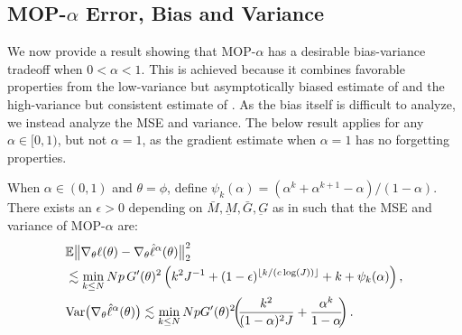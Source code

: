 \documentclass[numsec,webpdf,modern,medium,namedate]{oup-authoring-template}
\newcommand\arxiv[2]{#2} %
\theoremstyle{thmstyleone}%
\theoremstyle{thmstyletwo}%
\theoremstyle{thmstylethree}%
\begin{document}
\arxiv{}{\vspace*{-2mm}}
\subsection{MOP-$\alpha$ Error, Bias and Variance}

We now provide a result showing that MOP-$\alpha$ has a desirable bias-variance tradeoff when $0<\alpha<1$.
This is achieved because it combines favorable properties from the low-variance but asymptotically biased estimate of \cite{naesseth18} and the high-variance but consistent estimate of \cite{poyiadjis11}. 
As the bias itself is difficult to analyze, we instead analyze the MSE and variance. 
The below result applies for any $\alpha \in [0,1)$, but not $\alpha=1$, as the gradient estimate when $\alpha=1$ has no forgetting properties. 

\begin{thm}
    \label{thm:mop-biasvar}
    When $\alpha\in (0,1)$ and $\theta=\phi$, define $\psi_k(\alpha)=(\alpha^k  + \alpha^{k+1} - \alpha)/(1-\alpha)$. 
    There exists an $\epsilon>0$ depending on $\bar{M}, \underbar{M}, \bar{G}, \underbar{G}$ as in \cite{karjalainen23} such that the MSE and variance of MOP-$\alpha$ are:
    \vspace*{-1ex}
    \arxiv{\begin{eqnarray}
        \E\big\|\nabla_\theta\ell(\theta) - \nabla_\theta \hat\ell^\alpha(\theta)\big\|_2^2 
        &\lesssim& \min_{k \leq N} Np \, G'(\theta)^2\left(k^2J^{-1}+(1-\epsilon)^{\floor{k/(c\log(J))}}+k+\psi_k(\alpha)\right), \label{eq:mop-mse}
        \\
        \Var\big(\nabla_\theta \hat\ell^{\alpha}(\theta)\big) &\lesssim& \min_{k\leq N} Np \, G'(\theta)^2\left(\frac{k^2}{(1-\alpha)^2J} + \frac{\alpha^{k}}{1-\alpha}N\right). \label{eq:mop-variance}
        \end{eqnarray}}{\begin{align}
        &\mathbb{E}\big\|\nabla_\theta\ell(\theta) - \nabla_\theta \hat\ell^\alpha(\theta)\big\|_2^2 \label{eq:mop-mse}\\
        &\lesssim \min_{k \leq N} Np \, G'(\theta)^2\left(k^2J^{-1}+(1-\epsilon)^{\lfloor k/(c\log(J)) \rfloor}+k+\psi_k(\alpha)\right), \nonumber 
        \\
        &\mathrm{Var}\big(\nabla_\theta \hat\ell^{\alpha}(\theta)\big) \lesssim \min_{k\leq N} Np  G'(\theta)^2\hspace{-0.8ex}\left(\hspace{-0.8ex}\frac{k^2}{(1-\alpha)^2J} + \frac{\alpha^{k}}{1-\alpha}\hspace{-0.8ex}\right). \label{eq:mop-variance}
        \end{align}}
\end{thm}
\arxiv{}{\vspace*{-1ex}}
\end{document}
